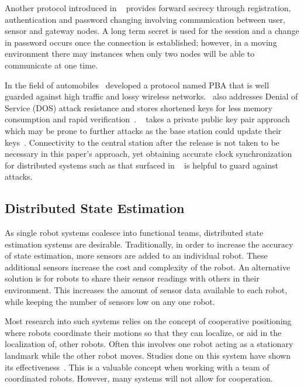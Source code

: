 \documentclass[conference]{IEEEtran}
\begin{document}
Another protocol introduced in ~\textcite{chang2016provably} provides forward secrecy through registration, authentication and password changing involving communication between user, sensor and gateway nodes. A long term secret is used for the session and a change in password occurs once the connection is established; however, in a moving environment there may instances when only two nodes will be able to communicate at one time.

In the field of automobiles~\textcite{lyu2016pba} developed a protocol named PBA that is well guarded against high traffic and lossy wireless networks.~\textcite{lyu2016pba} also addresses Denial of Service (DOS) attack resistance and stores shortened keys for less memory consumption and rapid verification~\cite{lyu2016pba}. ~\textcite{lyu2016pba} takes a private public key pair approach which may be prone to further attacks as the base station could update their keys~\cite{lyu2016pba}. Connectivity to the central station after the release is not taken to be necessary in this paper's approach, yet obtaining accurate clock synchronization for distributed systems such as that surfaced in ~\textcite{Park2016method} is helpful to guard against attacks.

\subsection{Distributed State Estimation}
As single robot systems coalesce into functional teams, distributed state estimation systems are desirable. Traditionally, in order to increase the accuracy of state estimation, more sensors are added to an individual robot. These additional sensors increase the cost and complexity of the robot. An alternative solution is for robots to share their sensor readings with others in their environment. This increases the amount of sensor data available to each robot, while keeping the number of sensors low on any one robot.

Most research into such systems relies on the concept of cooperative positioning~\cite{Kurazume1994} where robots coordinate their motions so that they can localize, or aid in the localization of, other robots. Often this involves one robot acting as a stationary landmark while the other robot moves. Studies done on this system have shown its effectiveness~\cite{Kurazume1996, Kurazume1998, Kurazume2000}. This is a valuable concept when working with a team of coordinated robots. However, many systems will not allow for cooperation.
\end{document}
